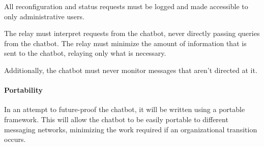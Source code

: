 All reconfiguration and status requests must be logged and made accessible to only administrative users.

The relay must interpret requests from the chatbot, never directly passing queries from the chatbot.
The relay must minimize the amount of information that is sent to the chatbot, relaying only what is necessary.

Additionally, the chatbot must never monitor messages that aren't directed at it.

\paragraph{Portability}
In an attempt to future-proof the chatbot, it will be written using a portable framework.
This will allow the chatbot to be easily portable to different messaging networks, minimizing the work required if an organizational transition occurs.
